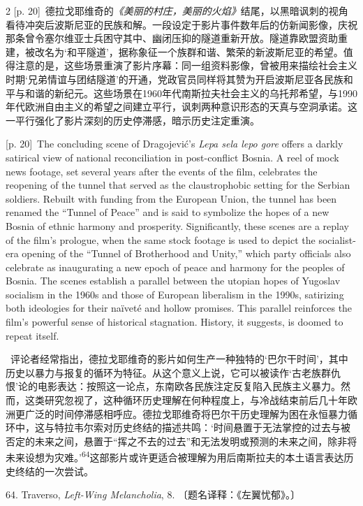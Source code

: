 \documentclass[10pt,a4paper]{article}
\begin{document}
\begin{paracol}{2}
{\scriptsize\color{gray} [p. 20]}\ 德拉戈耶维奇的\textit{《美丽的村庄，美丽的火焰》}结尾，以黑暗讽刺的视角看待冲突后波斯尼亚的民族和解。一段设定于影片事件数年后的仿新闻影像，庆祝那条曾令塞尔维亚士兵困守其中、幽闭压抑的隧道重新开放。隧道靠欧盟资助重建，被改名为‘和平隧道’，据称象征一个族群和谐、繁荣的新波斯尼亚的希望。值得注意的是，这些场景重演了影片序幕：同一组资料影像，曾被用来描绘社会主义时期‘兄弟情谊与团结隧道’的开通，党政官员同样将其赞为开启波斯尼亚各民族和平与和谐的新纪元。这些场景在1960年代南斯拉夫社会主义的乌托邦希望，与1990年代欧洲自由主义的希望之间建立平行，讽刺两种意识形态的天真与空洞承诺。这一平行强化了影片深刻的历史停滞感，暗示历史注定重演。\par
\switchcolumn
{\scriptsize\color{gray} [p. 20]}\ The concluding scene of Dragojević’s \textit{Lepa sela lepo gore} offers a darkly satirical view of national reconciliation in post-conflict Bosnia. A reel of mock news footage, set several years after the events of the film, celebrates the reopening of the tunnel that served as the claustrophobic setting for the Serbian soldiers. Rebuilt with funding from the European Union, the tunnel has been renamed the “Tunnel of Peace” and is said to symbolize the hopes of a new Bosnia of ethnic harmony and prosperity. Significantly, these scenes are a replay of the film’s prologue, when the same stock footage is used to depict the socialist-era opening of the “Tunnel of Brotherhood and Unity,” which party officials also celebrate as inaugurating a new epoch of peace and harmony for the peoples of Bosnia. The scenes establish a parallel between the utopian hopes of Yugoslav socialism in the 1960s and those of European liberalism in the 1990s, satirizing both ideologies for their naïveté and hollow promises. This parallel reinforces the film’s powerful sense of historical stagnation. History, it suggests, is doomed to repeat itself.\par
\switchcolumn*
{\scriptsize\color{gray} [p. 20]}\ 评论者经常指出，德拉戈耶维奇的影片如何生产一种独特的‘巴尔干时间’，其中历史以暴力与报复的循环为特征。从这个意义上说，它可以被读作‘古老族群仇恨’论的电影表达：按照这一论点，东南欧各民族注定反复陷入民族主义暴力。然而，这类研究忽视了，这种循环历史理解在何种程度上，与冷战结束前后几十年欧洲更广泛的时间停滞感相呼应。德拉戈耶维奇将巴尔干历史理解为困在永恒暴力循环中，这与特拉韦尔索对历史终结的描述共鸣：‘时间悬置于无法掌控的过去与被否定的未来之间，悬置于“挥之不去的过去”和无法发明或预测的未来之间，除非将未来设想为灾难。’\nobreak\textsuperscript{64}这部影片或许更适合被理解为用后南斯拉夫的本土语言表达历史终结的一次尝试。\par{\small 64. Traverso, \textit{Left-Wing Melancholia}, 8. 〔题名译释：《左翼忧郁》。〕\par}

\end{paracol}
\end{document}
